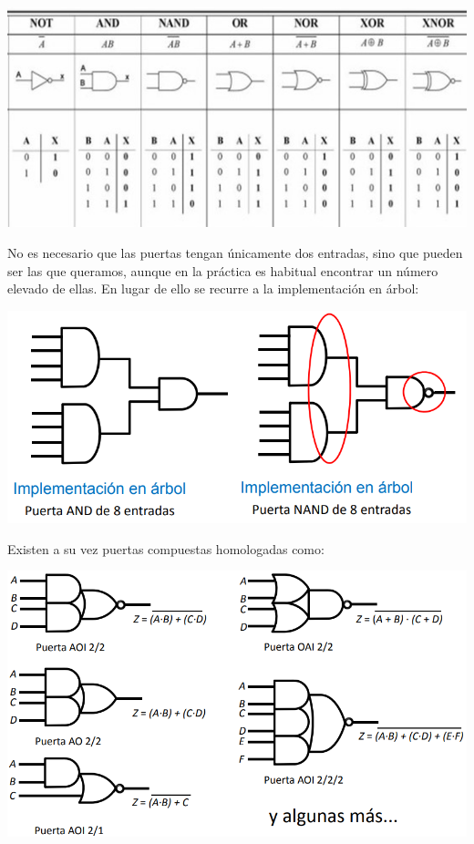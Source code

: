 \documentclass[a4paper,10pt]{book}
\begin{document}
\begin{center}
\includegraphics[scale=0.75]{puertas logicas}
\end{center}

No es necesario que las puertas tengan únicamente dos entradas, sino que pueden ser las que queramos, aunque en la práctica es habitual encontrar un número elevado de ellas. En lugar de ello se recurre a la implementación en árbol:

\begin{center}
\includegraphics[scale=0.5]{imp arbol}
\end{center}

Existen a su vez puertas compuestas homologadas como:

\begin{center}
\includegraphics[scale=0.5]{puertas compuestas}
\end{center}
\end{document}
